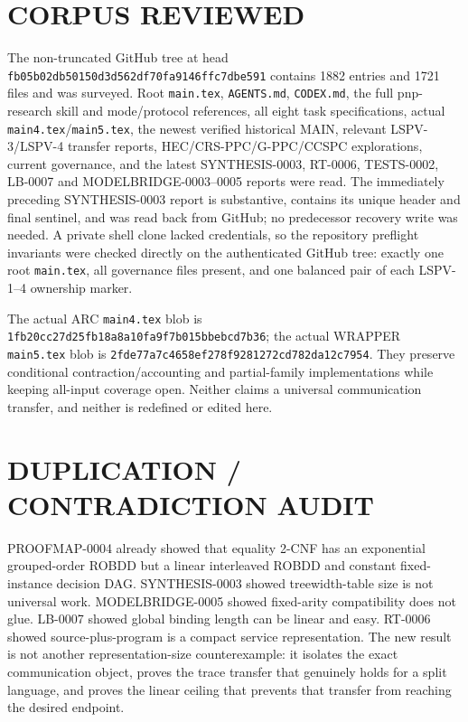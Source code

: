 \documentclass[11pt]{article}
\begin{document}
\section{CORPUS REVIEWED}
The non-truncated GitHub tree at head
\texttt{fb05b02db50150d3d562df70fa9146ffc7dbe591} contains 1882 entries and
1721 files and was surveyed.  Root \texttt{main.tex}, \texttt{AGENTS.md},
\texttt{CODEX.md}, the full pnp-research skill and mode/protocol references,
all eight task specifications, actual \texttt{main4.tex}/\texttt{main5.tex},
the newest verified historical MAIN, relevant LSPV-3/LSPV-4 transfer reports,
HEC/CRS-PPC/G-PPC/CCSPC explorations, current governance, and the latest
SYNTHESIS-0003, RT-0006, TESTS-0002, LB-0007 and MODELBRIDGE-0003--0005
reports were read.  The immediately preceding SYNTHESIS-0003 report is
substantive, contains its unique header and final sentinel, and was read back
from GitHub; no predecessor recovery write was needed.  A private shell clone
lacked credentials, so the repository preflight invariants were checked
directly on the authenticated GitHub tree: exactly one root
\texttt{main.tex}, all governance files present, and one balanced pair of
each LSPV-1--4 ownership marker.

The actual ARC \texttt{main4.tex} blob is
\texttt{1fb20cc27d25fb18a8a10fa9f7b015bbebcd7b36}; the actual WRAPPER
\texttt{main5.tex} blob is
\texttt{2fde77a7c4658ef278f9281272cd782da12c7954}.  They preserve conditional
contraction/accounting and partial-family implementations while keeping
all-input coverage open.  Neither claims a universal communication transfer,
and neither is redefined or edited here.

\section{DUPLICATION / CONTRADICTION AUDIT}
PROOFMAP-0004 already showed that equality 2-CNF has an exponential
grouped-order ROBDD but a linear interleaved ROBDD and constant fixed-instance
decision DAG.  SYNTHESIS-0003 showed treewidth-table size is not universal
work.  MODELBRIDGE-0005 showed fixed-arity compatibility does not glue.
LB-0007 showed global binding length can be linear and easy.  RT-0006 showed
source-plus-program is a compact service representation.  The new result is
not another representation-size counterexample: it isolates the exact
communication object, proves the trace transfer that genuinely holds for a
split language, and proves the linear ceiling that prevents that transfer
from reaching the desired endpoint.
\end{document}
